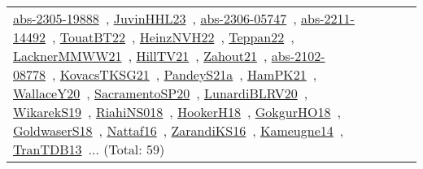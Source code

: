 {\begin{longtable}{lp{3cm}>{\raggedright\arraybackslash}p{6cm}>{\raggedright\arraybackslash}p{6cm}>{\raggedright\arraybackslash}p{8cm}}
\href{works/abs-2305-19888.pdf}{abs-2305-19888}~\cite{abs-2305-19888}, \href{works/JuvinHHL23.pdf}{JuvinHHL23}~\cite{JuvinHHL23}, \href{works/abs-2306-05747.pdf}{abs-2306-05747}~\cite{abs-2306-05747}, \href{works/abs-2211-14492.pdf}{abs-2211-14492}~\cite{abs-2211-14492}, \href{works/TouatBT22.pdf}{TouatBT22}~\cite{TouatBT22}, \href{works/HeinzNVH22.pdf}{HeinzNVH22}~\cite{HeinzNVH22}, \href{works/Teppan22.pdf}{Teppan22}~\cite{Teppan22}, \href{works/LacknerMMWW21.pdf}{LacknerMMWW21}~\cite{LacknerMMWW21}, \href{works/HillTV21.pdf}{HillTV21}~\cite{HillTV21}, \href{works/Zahout21.pdf}{Zahout21}~\cite{Zahout21}, \href{works/abs-2102-08778.pdf}{abs-2102-08778}~\cite{abs-2102-08778}, \href{works/KovacsTKSG21.pdf}{KovacsTKSG21}~\cite{KovacsTKSG21}, \href{works/PandeyS21a.pdf}{PandeyS21a}~\cite{PandeyS21a}, \href{works/HamPK21.pdf}{HamPK21}~\cite{HamPK21}, \href{works/WallaceY20.pdf}{WallaceY20}~\cite{WallaceY20}, \href{works/SacramentoSP20.pdf}{SacramentoSP20}~\cite{SacramentoSP20}, \href{works/LunardiBLRV20.pdf}{LunardiBLRV20}~\cite{LunardiBLRV20}, \href{works/WikarekS19.pdf}{WikarekS19}~\cite{WikarekS19}, \href{works/RiahiNS018.pdf}{RiahiNS018}~\cite{RiahiNS018}, \href{works/HookerH18.pdf}{HookerH18}~\cite{HookerH18}, \href{works/GokgurHO18.pdf}{GokgurHO18}~\cite{GokgurHO18}, \href{works/GoldwaserS18.pdf}{GoldwaserS18}~\cite{GoldwaserS18}, \href{works/Nattaf16.pdf}{Nattaf16}~\cite{Nattaf16}, \href{works/ZarandiKS16.pdf}{ZarandiKS16}~\cite{ZarandiKS16}, \href{works/Kameugne14.pdf}{Kameugne14}~\cite{Kameugne14}, \href{works/TranTDB13.pdf}{TranTDB13}~\cite{TranTDB13}... (Total: 59)\\

\end{longtable}}
